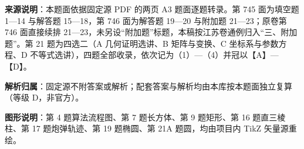 

\begin{gknotice}
\textbf{来源说明}：本题面依据固定源 PDF 的两页 A3 题面逐题转录。第 745 面为填空题 1—14 与解答题 15—18，第 746 面为解答题 19—20 与附加题 21—23；原卷第 746 面直接续排 21—23，未另设“附加题”标题，本稿按江苏卷通例归入“三、附加题”。第 21 题为四选二（A 几何证明选讲、B 矩阵与变换、C 坐标系与参数方程、D 不等式选讲），四题全部收录，依次记为（1）—（4）并冠以【A】—【D】。

\textbf{解析归属}：固定源不附答案或解析；配套答案与解析均由本库按本题面独立复算（等级 D，非官方）。

\textbf{图形说明}：第 4 题算法流程图、第 7 题长方体、第 9 题矩形、第 16 题直三棱柱、第 17 题炮弹轨迹、第 19 题椭圆、第 21A 题圆，均由项目内 TikZ 矢量源重绘。
\end{gknotice}


